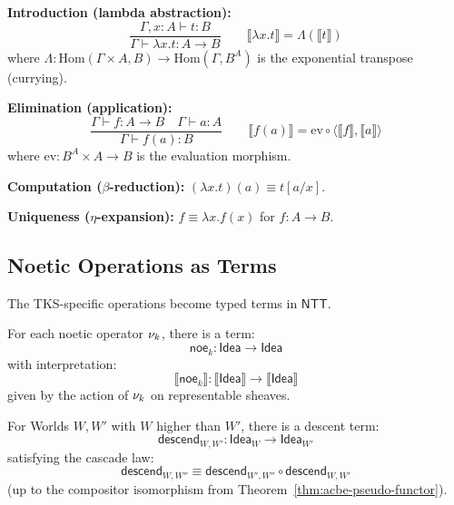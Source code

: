 \begin{definition}
\label{def:function-rules}
\textbf{Introduction (lambda abstraction):}
\[
  \frac{\Gamma, x : A \vdash t : B}
       {\Gamma \vdash \lambda x. t : A \to B}
  \qquad
  \llbracket \lambda x. t \rrbracket = \Lambda(\llbracket t \rrbracket)
\]
where $\Lambda : \mathrm{Hom}(\Gamma \times A, B) \to \mathrm{Hom}(\Gamma, B^A)$ is the
exponential transpose (currying).

\textbf{Elimination (application):}
\[
  \frac{\Gamma \vdash f : A \to B \quad \Gamma \vdash a : A}
       {\Gamma \vdash f(a) : B}
  \qquad
  \llbracket f(a) \rrbracket = \mathrm{ev} \circ \langle \llbracket f \rrbracket, \llbracket a \rrbracket \rangle
\]
where $\mathrm{ev} : B^A \times A \to B$ is the evaluation morphism.

\textbf{Computation ($\beta$-reduction):} $(\lambda x. t)(a) \equiv t[a/x]$.

\textbf{Uniqueness ($\eta$-expansion):} $f \equiv \lambda x. f(x)$ for $f : A \to B$.
\end{definition}

\subsection{Noetic Operations as Terms}
\label{subsec:noetic-operations-terms}

The TKS-specific operations become typed terms in $\mathsf{NTT}$.

\begin{definition}
\label{def:noetic-operator-terms}
For each noetic operator $\nu_{k}$, there is a term:
\[
  \mathsf{noe}_k : \mathsf{Idea} \to \mathsf{Idea}
\]
with interpretation:
\[
  \llbracket \mathsf{noe}_k \rrbracket : \llbracket \mathsf{Idea} \rrbracket \to \llbracket \mathsf{Idea} \rrbracket
\]
given by the action of $\nu_{k}$ on representable sheaves.
\end{definition}

\begin{definition}
\label{def:acbe-descent-terms}
For Worlds $W, W'$ with $W$ higher than $W'$, there is a descent term:
\[
  \mathsf{descend}_{W,W'} : \mathsf{Idea}_W \to \mathsf{Idea}_{W'}
\]
satisfying the cascade law:
\[
  \mathsf{descend}_{W,W''} \equiv \mathsf{descend}_{W',W''} \circ \mathsf{descend}_{W,W'}
\]
(up to the compositor isomorphism from Theorem~\ref{thm:acbe-pseudo-functor}).
\end{definition}

